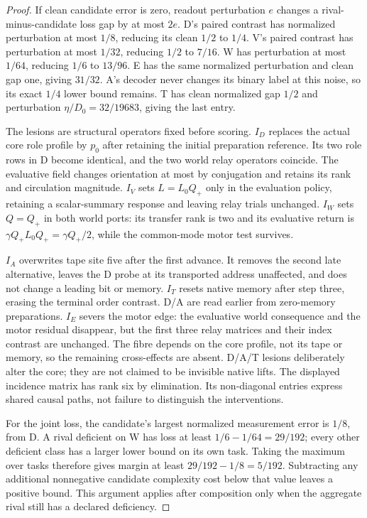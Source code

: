 \documentclass[11pt,a4paper]{article}
\theoremstyle{definition}
\begin{document}
\begin{proof}
If clean candidate error is zero, readout perturbation $e$ changes a rival-minus-candidate loss gap by at most $2e$. D's paired contrast has normalized perturbation at most $1/8$, reducing its clean $1/2$ to $1/4$. V's paired contrast has perturbation at most $1/32$, reducing $1/2$ to $7/16$. W has perturbation at most $1/64$, reducing $1/6$ to $13/96$. E has the same normalized perturbation and clean gap one, giving $31/32$. A's decoder never changes its binary label at this noise, so its exact $1/4$ lower bound remains. T has clean normalized gap $1/2$ and perturbation $\eta/D_0=32/19683$, giving the last entry.

The lesions are structural operators fixed before scoring. $I_D$ replaces the actual core role profile by $p_0$ after retaining the initial preparation reference. Its two role rows in D become identical, and the two world relay operators coincide. The evaluative field changes orientation at most by conjugation and retains its rank and circulation magnitude. $I_V$ sets $L=L_0Q_+$ only in the evaluation policy, retaining a scalar-summary response and leaving relay trials unchanged. $I_W$ sets $Q=Q_+$ in both world ports: its transfer rank is two and its evaluative return is $\gamma Q_+L_0Q_+=\gamma Q_+/2$, while the common-mode motor test survives.

$I_A$ overwrites tape site five after the first advance. It removes the second late alternative, leaves the D probe at its transported address unaffected, and does not change a leading bit or memory. $I_T$ resets native memory after step three, erasing the terminal order contrast. D/A are read earlier from zero-memory preparations. $I_E$ severs the motor edge: the evaluative world consequence and the motor residual disappear, but the first three relay matrices and their index contrast are unchanged. The fibre depends on the core profile, not its tape or memory, so the remaining cross-effects are absent. D/A/T lesions deliberately alter the core; they are not claimed to be invisible native lifts. The displayed incidence matrix has rank six by elimination. Its non-diagonal entries express shared causal paths, not failure to distinguish the interventions.

For the joint loss, the candidate's largest normalized measurement error is $1/8$, from D. A rival deficient on W has loss at least $1/6-1/64=29/192$; every other deficient class has a larger lower bound on its own task. Taking the maximum over tasks therefore gives margin at least $29/192-1/8=5/192$. Subtracting any additional nonnegative candidate complexity cost below that value leaves a positive bound. This argument applies after composition only when the aggregate rival still has a declared deficiency.
\end{proof}
\end{document}
